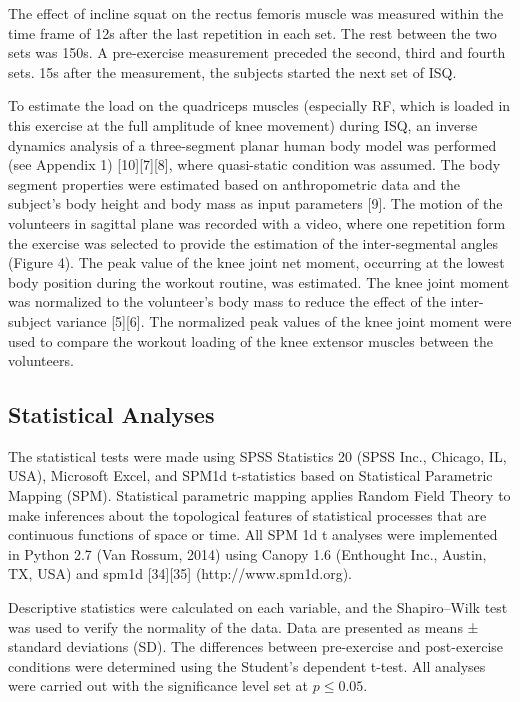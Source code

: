 \documentclass[utf8]{style/FrontiersinHarvard}
\begin{document}
The effect of incline squat on the rectus femoris muscle was measured within the time frame of 12s after the last repetition in each set.
The rest between the two sets was 150s.
A pre-exercise measurement preceded the second, third and fourth sets.
15s after the measurement, the subjects started the next set of ISQ.

To estimate the load on the quadriceps muscles (especially RF, which is loaded in this exercise at the full amplitude of knee movement) during ISQ, an inverse dynamics analysis of a three-segment planar human body model was performed (see Appendix 1) [10][7][8], where quasi-static condition was assumed.
The body segment properties were estimated based on anthropometric data and the subject’s body height and body mass as input parameters [9].
The motion of the volunteers in sagittal plane was recorded with a video, where one repetition form the exercise was selected to provide the estimation of the inter-segmental angles (Figure 4).
The peak value of the knee joint net moment, occurring at the lowest body position during the workout routine, was estimated.
The knee joint moment was normalized to the volunteer’s body mass to reduce the effect of the inter-subject variance [5][6].
The normalized peak values of the knee joint moment were used to compare the workout loading of the knee extensor muscles between the volunteers.

\subsection{Statistical Analyses}
The statistical tests were made using SPSS Statistics 20 (SPSS Inc., Chicago, IL, USA), Microsoft Excel, and SPM1d t-statistics based on Statistical Parametric Mapping (SPM).
Statistical parametric mapping applies Random Field Theory to make inferences about the topological features of statistical processes that are continuous functions of space or time.
All SPM 1d t analyses were implemented in Python 2.7 (Van Rossum, 2014) using Canopy 1.6 (Enthought Inc., Austin, TX, USA) and spm1d [34][35] (http://www.spm1d.org).

Descriptive statistics were calculated on each variable, and the Shapiro–Wilk test was used to verify the normality of the data.
Data are presented as means ± standard deviations (SD).
The differences between pre-exercise and post-exercise conditions were determined using the Student’s dependent t-test.
All analyses were carried out with the significance level set at $ p \leq 0.05 $.
\end{document}
